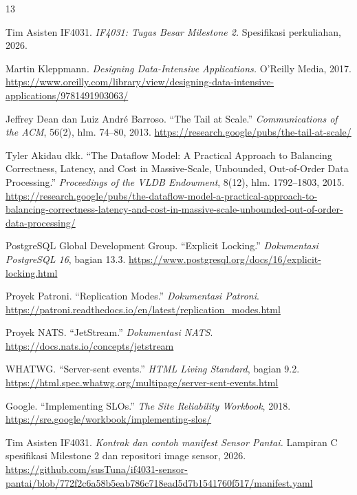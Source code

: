\begin{thebibliography}{13}

Tim Asisten IF4031. \emph{IF4031: Tugas Besar Milestone 2.}
Spesifikasi perkuliahan, 2026.

Martin Kleppmann. \emph{Designing Data-Intensive Applications.}
O'Reilly Media, 2017.
\url{https://www.oreilly.com/library/view/designing-data-intensive-applications/9781491903063/}

Jeffrey Dean dan Luiz Andr\'e Barroso. \textquotedblleft{}The Tail at Scale.\textquotedblright{}
\emph{Communications of the ACM}, 56(2), hlm. 74--80, 2013.
\url{https://research.google/pubs/the-tail-at-scale/}

Tyler Akidau dkk. \textquotedblleft{}The Dataflow Model: A Practical Approach to Balancing
Correctness, Latency, and Cost in Massive-Scale, Unbounded, Out-of-Order Data Processing.\textquotedblright{}
\emph{Proceedings of the VLDB Endowment}, 8(12), hlm. 1792--1803, 2015.
\url{https://research.google/pubs/the-dataflow-model-a-practical-approach-to-balancing-correctness-latency-and-cost-in-massive-scale-unbounded-out-of-order-data-processing/}

PostgreSQL Global Development Group. \textquotedblleft{}Explicit Locking.\textquotedblright{}
\emph{Dokumentasi PostgreSQL 16}, bagian 13.3.
\url{https://www.postgresql.org/docs/16/explicit-locking.html}

Proyek Patroni. \textquotedblleft{}Replication Modes.\textquotedblright{} \emph{Dokumentasi Patroni}.
\url{https://patroni.readthedocs.io/en/latest/replication_modes.html}

Proyek NATS. \textquotedblleft{}JetStream.\textquotedblright{} \emph{Dokumentasi NATS}.
\url{https://docs.nats.io/concepts/jetstream}

WHATWG. \textquotedblleft{}Server-sent events.\textquotedblright{} \emph{HTML Living Standard}, bagian 9.2.
\url{https://html.spec.whatwg.org/multipage/server-sent-events.html}

Google. \textquotedblleft{}Implementing SLOs.\textquotedblright{} \emph{The Site Reliability Workbook}, 2018.
\url{https://sre.google/workbook/implementing-slos/}

Tim Asisten IF4031. \emph{Kontrak dan contoh manifest Sensor Pantai.}
Lampiran C spesifikasi Milestone 2 dan repositori image sensor, 2026.
\url{https://github.com/susTuna/if4031-sensor-pantai/blob/772f2c6a58b5eab786c718ead5d7b1541760f517/manifest.yaml}


\end{thebibliography}
